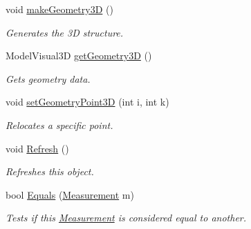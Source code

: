 \begin{DoxyCompactItemize}
void \hyperlink{class_l_i_d_a_r___controller_1_1_measurement_a933a499970b57f6595614ab7e6877169}{make\+Geometry3D} ()
\begin{DoxyCompactList}\small\item\em Generates the 3D structure. \end{DoxyCompactList}\item 
Model\+Visual3D \hyperlink{class_l_i_d_a_r___controller_1_1_measurement_acb4a4c1b8d4e838e1fc95c046a27ad12}{get\+Geometry3D} ()
\begin{DoxyCompactList}\small\item\em Gets geometry data. \end{DoxyCompactList}\item 
void \hyperlink{class_l_i_d_a_r___controller_1_1_measurement_a57da7ae842281b4d9a48e4c3c8378057}{set\+Geometry\+Point3D} (int i, int k)
\begin{DoxyCompactList}\small\item\em Relocates a specific point. \end{DoxyCompactList}\item 
void \hyperlink{class_l_i_d_a_r___controller_1_1_measurement_ae5d481304bf3a19445cdb8280fbc57ca}{Refresh} ()
\begin{DoxyCompactList}\small\item\em Refreshes this object. \end{DoxyCompactList}\item 
bool \hyperlink{class_l_i_d_a_r___controller_1_1_measurement_a953088b913a0db123029129db70ab5e8}{Equals} (\hyperlink{class_l_i_d_a_r___controller_1_1_measurement}{Measurement} m)
\begin{DoxyCompactList}\small\item\em Tests if this \hyperlink{class_l_i_d_a_r___controller_1_1_measurement}{Measurement} is considered equal to another. \end{DoxyCompactList}\end{DoxyCompactItemize}

